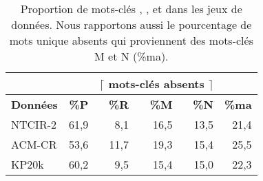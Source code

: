 \begin{table}[!hbt]
    \centering
    \begin{tabular}{l|rrrr|r}
    \multicolumn{2}{c}{~} &
    \multicolumn{3}{c}{\small{$\lceil$ \hfill {\scriptsize mots-clés absents} \hfill $\rceil$}}
    \\
    \toprule
    \textbf{Données}  & \textbf{\%P} & \textbf{\%R} & \textbf{\%M} & \textbf{\%N} & \textbf{\%ma} \\
    \midrule
     NTCIR-2 & 61,9 &  8,1 & 16,5 & 13,5 & 21,4 \\
     ACM-CR  & 53,6 & 11,7 & 19,3 & 15,4 & 25,5 \\
     KP20k   & 60,2 &  9,5 & 15,4 & 15,0 & 22,3 \\
    \bottomrule
    \end{tabular}
    \caption{Proportion de mots-clés \presents{}, \reordonnes{}, \mixtes{} et \nonvus{} dans les jeux de données. Nous rapportons aussi le pourcentage de mots unique absents qui proviennent des mots-clés M et N (\%ma).}
    \label{tab:prmu_dist_ref}
\end{table}

